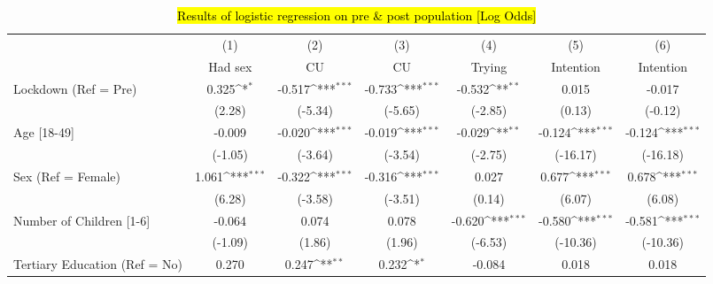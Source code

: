 
\begin{table*}[!ht]
\begin{adjustwidth}{-1.25in}{0in}
\def\sym#1{\ifmmode^{#1}\else\(^{#1}\)\fi}
\caption{\hl{Results of logistic regression on pre \& post population [Log Odds]}}
\begin{tabular}{l*{6}{c}}
\hline\hline
                    &\multicolumn{1}{c}{(1)}&\multicolumn{1}{c}{(2)}&\multicolumn{1}{c}{(3)}&\multicolumn{1}{c}{(4)}&\multicolumn{1}{c}{(5)}&\multicolumn{1}{c}{(6)}\\
                    &\multicolumn{1}{c}{Had sex}&\multicolumn{1}{c}{CU}&\multicolumn{1}{c}{CU}&\multicolumn{1}{c}{Trying}&\multicolumn{1}{c}{Intention}&\multicolumn{1}{c}{Intention}\\
\hline

Lockdown (Ref = Pre)      &       0.325\sym{*}  &      -0.517\sym{***}&      -0.733\sym{***}&      -0.532\sym{**} &      0.015         &     -0.017         \\
                    &      (2.28)         &     (-5.34)         &     (-5.65)         &     (-2.85)         &      (0.13)         &     (-0.12)         \\
[1em]
Age [18-49]                &    -0.009         &     -0.020\sym{***}&     -0.019\sym{***}&     -0.029\sym{**} &      -0.124\sym{***}&      -0.124\sym{***}\\
                    &     (-1.05)         &     (-3.64)         &     (-3.54)         &     (-2.75)         &    (-16.17)         &    (-16.18)         \\
[1em]
Sex (Ref = Female)                &       1.061\sym{***}&      -0.322\sym{***}&      -0.316\sym{***}&      0.027         &       0.677\sym{***}&       0.678\sym{***}\\
                    &      (6.28)         &     (-3.58)         &     (-3.51)         &      (0.14)         &      (6.07)         &      (6.08)         \\
[1em]
Number of Children [1-6] &     -0.064         &      0.074         &      0.078        &      -0.620\sym{***}&      -0.580\sym{***}&      -0.581\sym{***}\\
                    &     (-1.09)         &      (1.86)         &      (1.96)         &     (-6.53)         &    (-10.36)         &    (-10.36)         \\
[1em]
Tertiary Education (Ref = No)  &       0.270         &       0.247\sym{**} &       0.232\sym{*}  &     -0.084         &      0.018         &      0.018         \\

\end{tabular}
\end{adjustwidth}
\end{table*}
